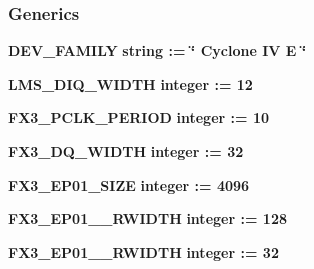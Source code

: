 \subsubsection*{Generics}
 \begin{DoxyCompactItemize}
\item 
{\bf D\+E\+V\+\_\+\+F\+A\+M\+I\+LY} {\bfseries {\bfseries \textcolor{comment}{string}\textcolor{vhdlchar}{ }\textcolor{vhdlchar}{ }\textcolor{vhdlchar}{\+:}\textcolor{vhdlchar}{=}\textcolor{vhdlchar}{ }\textcolor{vhdlchar}{ }\textcolor{vhdlchar}{ }\textcolor{vhdlchar}{ }\textcolor{keyword}{\char`\"{} Cyclone I\+V E \char`\"{}}\textcolor{vhdlchar}{ }}}
\item 
{\bf L\+M\+S\+\_\+\+D\+I\+Q\+\_\+\+W\+I\+D\+TH} {\bfseries {\bfseries \textcolor{comment}{integer}\textcolor{vhdlchar}{ }\textcolor{vhdlchar}{ }\textcolor{vhdlchar}{\+:}\textcolor{vhdlchar}{=}\textcolor{vhdlchar}{ }\textcolor{vhdlchar}{ } \textcolor{vhdldigit}{12} \textcolor{vhdlchar}{ }}}
\item 
{\bf F\+X3\+\_\+\+P\+C\+L\+K\+\_\+\+P\+E\+R\+I\+OD} {\bfseries {\bfseries \textcolor{comment}{integer}\textcolor{vhdlchar}{ }\textcolor{vhdlchar}{ }\textcolor{vhdlchar}{\+:}\textcolor{vhdlchar}{=}\textcolor{vhdlchar}{ }\textcolor{vhdlchar}{ } \textcolor{vhdldigit}{10} \textcolor{vhdlchar}{ }}}
\item 
{\bf F\+X3\+\_\+\+D\+Q\+\_\+\+W\+I\+D\+TH} {\bfseries {\bfseries \textcolor{comment}{integer}\textcolor{vhdlchar}{ }\textcolor{vhdlchar}{ }\textcolor{vhdlchar}{\+:}\textcolor{vhdlchar}{=}\textcolor{vhdlchar}{ }\textcolor{vhdlchar}{ } \textcolor{vhdldigit}{32} \textcolor{vhdlchar}{ }}}
\item 
{\bf F\+X3\+\_\+\+E\+P01\+\_\+\+S\+I\+ZE} {\bfseries {\bfseries \textcolor{comment}{integer}\textcolor{vhdlchar}{ }\textcolor{vhdlchar}{ }\textcolor{vhdlchar}{\+:}\textcolor{vhdlchar}{=}\textcolor{vhdlchar}{ }\textcolor{vhdlchar}{ } \textcolor{vhdldigit}{4096} \textcolor{vhdlchar}{ }}}
\item 
{\bf F\+X3\+\_\+\+E\+P01\+\_\+\_\+\+R\+W\+I\+D\+TH} {\bfseries {\bfseries \textcolor{comment}{integer}\textcolor{vhdlchar}{ }\textcolor{vhdlchar}{ }\textcolor{vhdlchar}{\+:}\textcolor{vhdlchar}{=}\textcolor{vhdlchar}{ }\textcolor{vhdlchar}{ } \textcolor{vhdldigit}{128} \textcolor{vhdlchar}{ }}}
\item 
{\bf F\+X3\+\_\+\+E\+P01\+\_\+\_\+\+R\+W\+I\+D\+TH} {\bfseries {\bfseries \textcolor{comment}{integer}\textcolor{vhdlchar}{ }\textcolor{vhdlchar}{ }\textcolor{vhdlchar}{\+:}\textcolor{vhdlchar}{=}\textcolor{vhdlchar}{ }\textcolor{vhdlchar}{ } \textcolor{vhdldigit}{32} \textcolor{vhdlchar}{ }}}

\end{DoxyCompactItemize}
